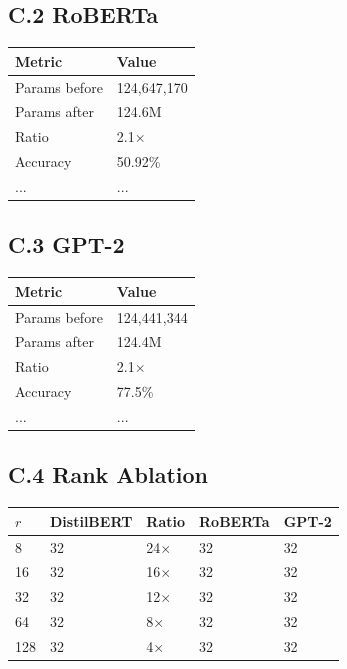\subsection{C.2 RoBERTa}

\begin{table}[H]
\centering
\small
\begin{tabular}{ll}
\toprule
\textbf{Metric} & \textbf{Value} \\
\midrule
Params before & 124,647,170 \\
Params after & 124.6M \\
Ratio & 2.1$\times$ \\
Accuracy & 50.92\% \\
... & ... \\
\bottomrule
\end{tabular}
\end{table}

\subsection{C.3 GPT-2}

\begin{table}[H]
\centering
\small
\begin{tabular}{ll}
\toprule
\textbf{Metric} & \textbf{Value} \\
\midrule
Params before & 124,441,344 \\
Params after & 124.4M \\
Ratio & 2.1$\times$ \\
Accuracy & 77.5\% \\
... & ... \\
\bottomrule
\end{tabular}
\end{table}

\subsection{C.4 Rank Ablation}

\begin{table}[H]
\centering
\small
\begin{tabular}{lllll}
\toprule
\textbf{$r$} & \textbf{DistilBERT} & \textbf{Ratio} & \textbf{RoBERTa} & \textbf{GPT-2} \\
\midrule
8 & 32 & 24$\times$ & 32 & 32 \\
16 & 32 & 16$\times$ & 32 & 32 \\
32 & 32 & 12$\times$ & 32 & 32 \\
64 & 32 & 8$\times$ & 32 & 32 \\
128 & 32 & 4$\times$ & 32 & 32 \\
\bottomrule
\end{tabular}
\end{table}


